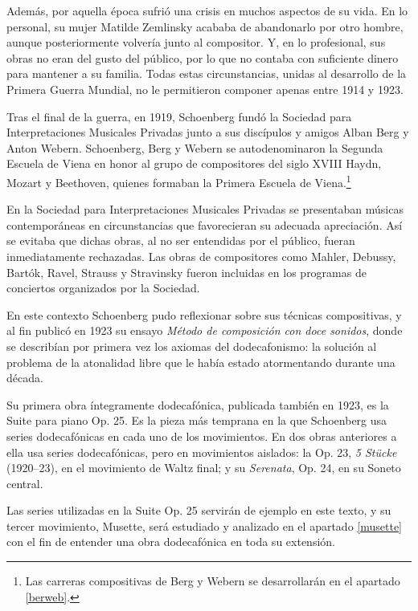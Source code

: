 		Además, por aquella época sufrió una crisis en muchos aspectos de su vida. En lo personal, su mujer Matilde Zemlinsky acababa de abandonarlo por otro hombre, aunque posteriormente volvería junto al compositor. Y, en lo profesional, sus obras no eran del gusto del público, por lo que no contaba con suficiente dinero para mantener a su familia. Todas estas circunstancias, unidas al desarrollo de la Primera Guerra Mundial, no le permitieron componer apenas entre 1914 y 1923.
		
		Tras el final de la guerra, en 1919, Schoenberg fundó la Sociedad para Interpretaciones Musicales Privadas junto a sus discípulos y amigos Alban Berg y Anton Webern. Schoenberg, Berg y Webern se autodenominaron la Segunda Escuela de Viena en honor al grupo de compositores del siglo XVIII Haydn, Mozart y Beethoven, quienes formaban la Primera Escuela de Viena.\footnote{Las carreras compositivas de Berg y Webern se desarrollarán en el apartado \ref{berweb}.}
		
		En la Sociedad para Interpretaciones Musicales Privadas se presentaban músicas contemporáneas en circunstancias que favorecieran su adecuada apreciación. Así se evitaba que dichas obras, al no ser entendidas por el público, fueran inmediatamente rechazadas. Las obras de compositores como Mahler, Debussy, Bartók, Ravel, Strauss y Stravinsky fueron incluidas en los programas de conciertos organizados por la Sociedad.
		
		En este contexto Schoenberg pudo reflexionar sobre sus técnicas compositivas, y al fin publicó en 1923 su ensayo \emph{Método de composición con doce sonidos}, donde se describían por primera vez los axiomas del dodecafonismo: la solución al problema de la atonalidad libre que le había estado atormentando durante una década.
		
		Su primera obra íntegramente dodecafónica, publicada también en 1923, es la Suite para piano Op. 25. Es la pieza más temprana en la que Schoenberg usa series dodecafónicas en cada uno de los movimientos. En dos obras anteriores a ella usa series dodecafónicas, pero en movimientos aislados: la Op. 23, \emph{5 Stücke} (1920--23), en el movimiento de Waltz final; y su \emph{Serenata}, Op. 24, en su Soneto central.
		
		Las series utilizadas en la Suite Op. 25 servirán de ejemplo en este texto, y su tercer movimiento, Musette, será estudiado y analizado en el apartado \ref{musette} con el fin de entender una obra dodecafónica en toda su extensión.
